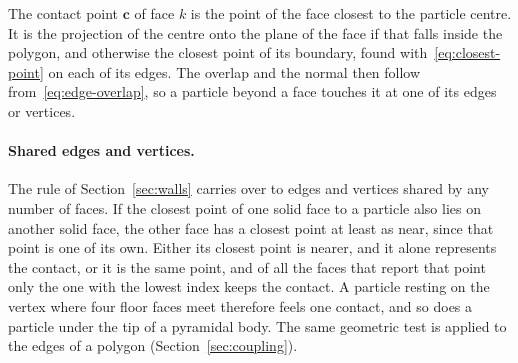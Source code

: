 The contact point $\mathbf{c}$ of face $k$ is the point of the face closest to the particle centre.
It is the projection of the centre onto the plane of the face if that falls inside the polygon, and otherwise the closest point of its boundary, found with~\eqref{eq:closest-point} on each of its edges.
The overlap and the normal then follow from~\eqref{eq:edge-overlap}, so a particle beyond a face touches it at one of its edges or vertices.

\paragraph{Shared edges and vertices.}
The rule of Section~\ref{sec:walls} carries over to edges and vertices shared by any number of faces.
If the closest point of one solid face to a particle also lies on another solid face, the other face has a closest point at least as near, since that point is one of its own.
Either its closest point is nearer, and it alone represents the contact, or it is the same point, and of all the faces that report that point only the one with the lowest index keeps the contact.
A particle resting on the vertex where four floor faces meet therefore feels one contact, and so does a particle under the tip of a pyramidal body.
The same geometric test is applied to the edges of a polygon (Section~\ref{sec:coupling}).

